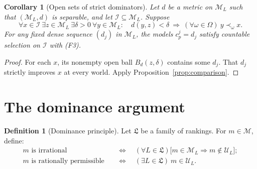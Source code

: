 \documentclass[11pt]{article}
\newtheorem{corollary}[theorem]{Corollary}
\theoremstyle{definition}
\newtheorem{definition}[theorem]{Definition}
\theoremstyle{remark}
\newcommand{\M}{\mathcal M}
\newcommand{\I}{\mathcal I}
\newcommand{\U}{\mathcal U}
\newcommand{\Lf}{\mathfrak L}
\begin{document}
\begin{corollary}[Open sets of strict dominators]\label{cor:robust-selection}
Let $d$ be a metric on $\M_L$ such that $(\M_L,d)$ is separable, and let $\I\subseteq\M_L$. Suppose
\[
\forall x\in\I\ \exists z\in\M_L\ \exists\delta>0\ \forall y\in\M_L:
\quad d(y,z)<\delta\ \Longrightarrow\ (\forall\omega\in\Omega)\ y\prec_\omega x.
\]
For any fixed dense sequence $(d_j)$ in $\M_L$, the models $c^j_p=d_j$ satisfy countable selection on $\I$ with (F3).
\end{corollary}
\begin{proof}
For each $x$, its nonempty open ball $B_d(z,\delta)$ contains some $d_j$. That $d_j$ strictly improves $x$ at every world. Apply Proposition~\ref{prop:comparison}.
\end{proof}

\section{The dominance argument}\label{sec:conclusion}

\begin{definition}[Dominance principle]\label{def:permissibility}
Let $\Lf$ be a family of rankings. For $m\in\M$, define:
\begin{align*}
m\text{ is irrational}&\quad\Longleftrightarrow\quad (\forall L\in\Lf)\bigl[m\in\M_L\Rightarrow m\notin\U_L\bigr];\\
m\text{ is rationally permissible}&\quad\Longleftrightarrow\quad (\exists L\in\Lf)\ m\in\U_L.
\end{align*}
\end{definition}
\end{document}
